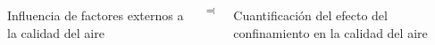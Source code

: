 \documentclass[xcolor=dvipsnames]{beamer}
\begin{document}
\begin{frame}
{\begin{columns}
                    \begin{column}{0.2\linewidth}
                        \centering
                        Influencia de factores externos a la calidad del aire
                    \end{column}
                    \begin{column}{0.05\linewidth}
                        \begin{equation*}
                            \Rightarrow
                        \end{equation*}
                    \end{column}

                    \begin{column}{0.2\linewidth}
                        Cuantificaci\'on del efecto del confinamiento en la calidad del aire
                    \end{column}
            \end{columns}}
			\end{frame}



		
		

	
\end{document}
